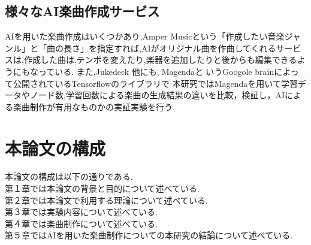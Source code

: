 \subsection{様々なAI楽曲作成サービス}
AIを用いた楽曲作成はいくつかあり,Amper Musicという「作成したい音楽ジャンル」と「曲の長さ」を指定すれば,AIがオリジナル曲を作曲してくれるサービスは,作成した曲は,テンポを変えたり,楽器を追加したりと後からも編集できるようにもなっている.
また,Jukedeck
他にも,MagendaというGoogole brainによって公開されているTensorflowのライブラリで
本研究ではMagendaを用いて学習データやノード数,学習回数による楽曲の生成結果の違いを比較，検証し，AIによる楽曲制作が有用なものかの実証実験を行う.
\section{本論文の構成}
本論文の構成は以下の通りである.\\
第１章では本論文の背景と目的について述べている.\\
第２章では本論文で利用する理論について述べている.\\
第３章では実験内容について述べている.\\
第４章では楽曲制作について述べている.\\
第５章ではAIを用いた楽曲制作についての本研究の結論について述べている.\\